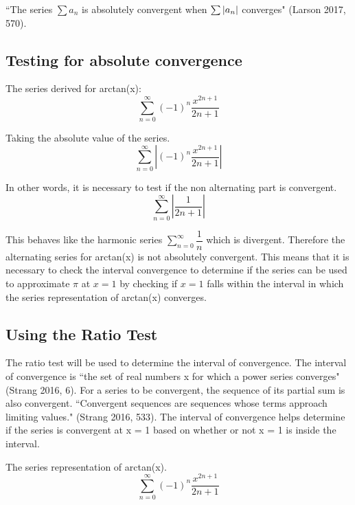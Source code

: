\documentclass[12pt, titlepage]{article}
\begin{document}
``The series \(\sum a_{n}\) is absolutely convergent when \(\sum \abs{a_{n}}\) converges" (Larson 2017, 570).

\subsection{Testing for absolute convergence}
The series derived for arctan(x):
\begin{equation*}
    \sum_{n=0}^{\infty} (-1)^{n} \frac{x^{2n+1}}{2n+1}
\end{equation*}

Taking the absolute value of the series.
\begin{equation*}
    \sum_{n=0}^{\infty}   \left |  (-1)^{n} \frac{x^{2n+1}}{2n+1} \right |
\end{equation*}

In other words, it is necessary to test if the non alternating part is convergent.
\begin{equation*}
    \sum_{n=0}^{\infty}   \left |\frac{1}{2n+1} \right |
\end{equation*}

This behaves like the harmonic series \(\sum\limits_{n=0}^{\infty} \dfrac{1}{n}\) which is divergent. Therefore the alternating series for arctan(x) is not absolutely convergent. This means that it is necessary to check the interval convergence to determine if the series can be used to approximate \(\pi\) at \(x = 1\) by checking if \(x = 1\) falls within the interval in which the series representation of arctan(x) converges.

\subsection{Using the Ratio Test}
The ratio test will be used to determine the interval of convergence. The interval of convergence is ``the set of real numbers x for which a power series converges" (Strang 2016, 6). For a series to be convergent, the sequence of its partial sum is also convergent. ``Convergent sequences are sequences whose terms approach limiting values." (Strang 2016, 533). The interval of convergence helps determine if the series is convergent at x = 1 based on whether or not x = 1 is inside the interval.

The series representation of arctan(x).
\begin{equation*}
    \sum_{n=0}^{\infty} (-1)^{n} \frac{x^{2n+1}}{2n+1}
\end{equation*}
 
\end{document}
